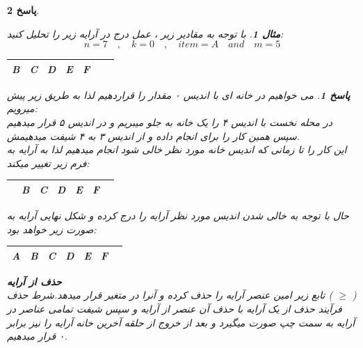 \documentclass[12pt]{article}
\newtheorem{question}{مثال}[section]
\newtheorem{answer}{پاسخ}[section]
\begin{document}
\begin{answer}
\begin{question}
با توجه به مقادیر زیر ، عمل درج در آرایه زیر را تحلیل کنید:
\[
n = 7 \quad , \quad k = 0 \quad , \quad item = A \quad and \quad  m  = 5
\]
\begin{LTR}
\begin{latin}
\begin{tabular}{|c|c|c|c|c|c|c|}
\hline
 B & C & D & E & F &  & \\
\hline
\end{tabular}
\end{latin}
\end{LTR}
\end{question}

\begin{answer}
می خواهیم در خانه ای با اندیس ۰ مقدار  را قراردهیم لذا به طریق زیر پیش میرویم:\\
در محله نخست  با اندیس ۴ را یک خانه به جلو میبریم و در اندیس ۵ قرار میدهیم\\
سپس همین کار را برای  انجام داده و از اندیس ۳ به ۴ شیفت میدهیمش.\\
این کار را تا زمانی که اندیس خانه مورد نظر خالی شود انجام میدهیم لذا به آرایه به فرم زیر تغییر میکند:\\
\begin{LTR}
\begin{latin}
\begin{tabular}{|c|c|c|c|c|c|c|}
\hline
& B & C & D & E & F & \\
\hline
\end{tabular}
\end{latin}
\end{LTR}


حال با توجه به خالی شدن اندیس مورد نظر آرایه  را درج کرده و شکل نهایی آرایه به صورت زیر خواهد بود:\\
\begin{LTR}
\begin{latin}
\begin{tabular}{|c|c|c|c|c|c|c|}
\hline
A& B & C & D & E & F & \\
\hline
\end{tabular}
\end{latin}
\end{LTR}
\end{answer}

\newpage

\textbf{حذف از آرایه }\\
تابع زیر امین عنصر آرایه را حذف کرده و آنرا در متغیر  قرار میدهد.شرط حذف ( $\ge$ )\\
فرآیند حذف از یک آرایه با حذف آن عنصر از آرایه و سپس شیفت تمامی عناصر در آرایه به سمت چپ صورت میگیرد و بعد از خروج از حلقه آخرین خانه آرایه را نیز برابر ۰ قرار میدهیم.\\


\end{answer}
\end{document}

